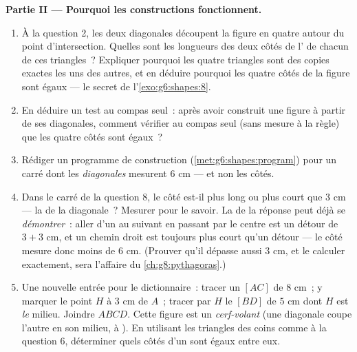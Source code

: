 \begin{problem}
\medskip
\noindent\textbf{Partie II --- Pourquoi les constructions
fonctionnent.}
\begin{enumerate}[resume]
  \item À la question 2, les deux diagonales découpent la figure en
        quatre  autour du point d'intersection.
        Quelles sont les longueurs des deux côtés de l'
        de chacun de ces triangles~? Expliquer pourquoi les quatre
        triangles sont des copies exactes les uns des autres, et en
        déduire pourquoi les quatre côtés de la figure sont égaux
        --- le secret de l'\cref{exo:g6:shapes:8}.
  \item En déduire un test au compas seul~: après avoir construit
        une figure à partir de ses diagonales, comment vérifier au
        compas seul (sans mesure à la règle) que les quatre côtés
        sont égaux~?
  \item Rédiger un programme de construction
        (\cref{met:g6:shapes:program}) pour un carré dont les
        \emph{diagonales} mesurent $6$ cm --- et non les côtés.
  \item Dans le carré de la question 8, le côté est-il plus long ou
        plus court que $3$ cm --- la  de la diagonale~?
        Mesurer pour le savoir. La  de la réponse peut déjà se
        \emph{démontrer}~: aller d'un  au suivant en passant
        par le centre est un détour de $3 + 3$ cm, et un chemin
        droit est toujours plus court qu'un détour --- le côté
        mesure donc moins de $6$ cm. (Prouver qu'il dépasse aussi
        $3$ cm, et le calculer exactement, sera l'affaire du
        \cref{ch:g8:pythagoras}.)
  \item Une nouvelle entrée pour le dictionnaire~: tracer un 
        $[AC]$ de $8$ cm~; y marquer le point $H$ à $3$ cm de $A$~;
        tracer par $H$ le   $[BD]$ de $5$ cm
        dont $H$ est \emph{le} milieu. Joindre $ABCD$. Cette figure
        est un \emph{cerf-volant} (une diagonale
        coupe l'autre en son milieu, à ). En utilisant
        les triangles des coins comme à la question 6, déterminer
        quels côtés d'un  sont égaux entre eux.
\end{enumerate}


\end{problem}
